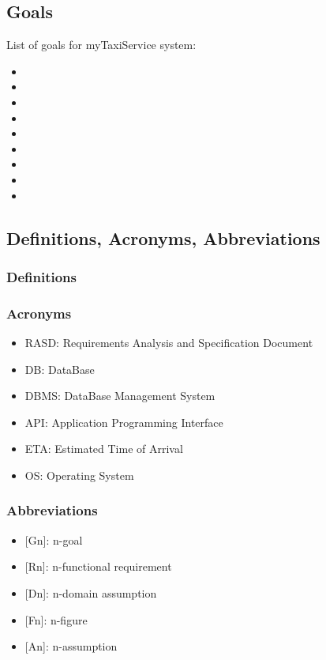 \documentclass[a4paper,12pt]{article}%
\newcounter{goals_counter}
\newcounter{func_req_counter}
\begin{document}
\subsection{Goals}
List of goals for myTaxiService system:
\begin{itemize}
\item {}
\item {}
\item {}
\item {}
\item {}
\item {}
\item {}
\item {} 
\item {} 
\end{itemize}
\subsection{Definitions, Acronyms, Abbreviations}
\subsubsection{Definitions}
\subsubsection{Acronyms}
\begin{itemize}
\item RASD: Requirements Analysis and Specification Document
\item DB: DataBase
\item DBMS: DataBase Management System
\item API: Application Programming Interface
\item ETA: Estimated Time of Arrival
\item OS: Operating System
\end{itemize}
\subsubsection{Abbreviations}
\begin{itemize}
\item {[}Gn{]}: n-goal %
\item {[}Rn{]}: n-functional requirement
\item {[}Dn{]}: n-domain assumption
\item {[}Fn{]}: n-figure
\item {[}An{]}: n-assumption
\end{itemize}
\end{document}
